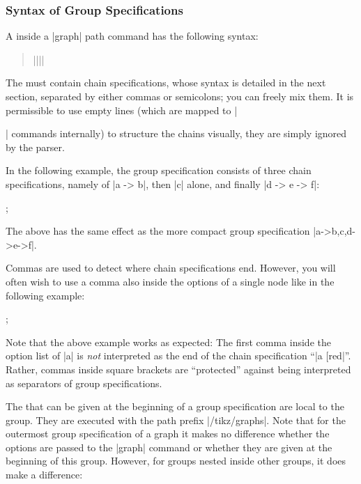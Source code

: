 \subsubsection{Syntax of Group Specifications}
\label{section-library-graphs-group-spec}

A  inside a |graph| path command has the
following syntax:
\begin{quote}
  |{||}|
\end{quote}
The  must contain chain specifications,
whose syntax is detailed in the next section, separated by either
commas or semicolons; you can freely mix them.
It is permissible to use empty lines (which are mapped to |\par|
commands internally) to structure the chains visually, they are simply
ignored by the parser. 

In the following example, the group specification consists of three
chain specifications, namely of |a -> b|, then |c| alone, and finally
|d -> e -> f|:
\begin{codeexample}[]
\tikz {};
\end{codeexample}
The above has the same effect as the more compact group specification
|{a->b,c,d->e->f}|.

Commas are used to detect where chain specifications end. However, you
will often wish to use a comma also inside the options of a single
node like in the following example:

\begin{codeexample}[]
\tikz {};
\end{codeexample}

Note that the above example works as expected: The first comma inside
the option list of |a| is \emph{not} interpreted as the end of the
chain specification ``|a [red|''. Rather, commas inside square
brackets are ``protected'' against being interpreted as separators of
group specifications.

The  that can be given at the beginning of a group
specification are local to the group. They are executed with the path
prefix |/tikz/graphs|. Note that for the outermost group specification
of a graph it makes no difference whether the options are passed to
the |graph| command or whether they are given at the beginning of this
group. However, for groups nested inside other groups, it does make a
difference:

